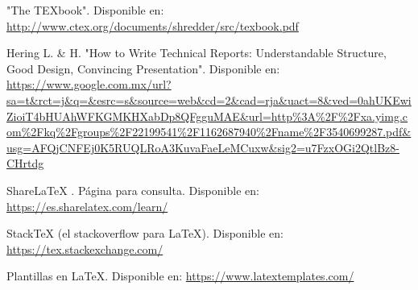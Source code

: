 \documentclass{report}
\begin{document}
\begin{thebibliography}{99}


 "The TEXbook". Disponible en: \url{http://www.ctex.org/documents/shredder/src/texbook.pdf}

 Hering L. \& H. "How to Write Technical Reports: Understandable Structure, Good Design, Convincing Presentation". Disponible en: \url{https://www.google.com.mx/url?sa=t&rct=j&q=&esrc=s&source=web&cd=2&cad=rja&uact=8&ved=0ahUKEwiZioiT4bHUAhWFKGMKHXabDp8QFgguMAE&url=http\%3A\%2F\%2Fxa.yimg.com\%2Fkq\%2Fgroups\%2F22199541\%2F1162687940\%2Fname\%2F3540699287.pdf&usg=AFQjCNFEj0K5RUQLRoA3KuvaFaeLeMCuxw&sig2=u7FzxOGi2QtlBz8-CHrtdg}

 ShareLaTeX . Página para consulta. Disponible en: \url{https://es.sharelatex.com/learn/}

 StackTeX (el stackoverflow para \LaTeX). Disponible en: \url{https://tex.stackexchange.com/}

 Plantillas en \LaTeX. Disponible en: \url{https://www.latextemplates.com/}
\end{thebibliography}
\end{document}
